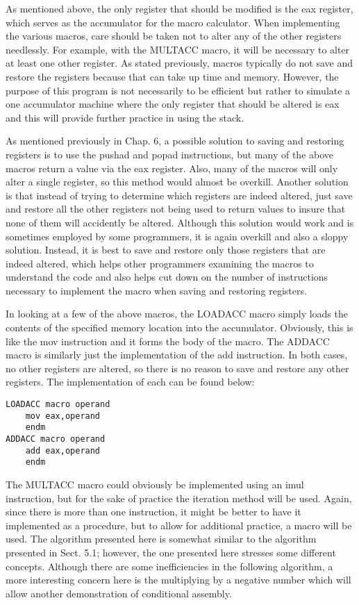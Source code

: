 \documentclass[10pt]{article}
\begin{document}
As mentioned above, the only register that should be modified is the eax register, which serves as the accumulator for the macro calculator. When implementing the various macros, care should be taken not to alter any of the other registers needlessly. For example, with the MULTACC macro, it will be necessary to alter at least one other register. As stated previously, macros typically do not save and restore the registers because that can take up time and memory. However, the purpose of this program is not necessarily to be efficient but rather to simulate a one accumulator machine where the only register that should be altered is eax and this will provide further practice in using the stack.

As mentioned previously in Chap. 6, a possible solution to saving and restoring registers is to use the pushad and popad instructions, but many of the above macros return a value via the eax register. Also, many of the macros will only alter a single register, so this method would almost be overkill. Another solution is that instead of trying to determine which registers are indeed altered, just save and restore all the other registers not being used to return values to insure that none of them will accidently be altered. Although this solution would work and is sometimes employed by some programmers, it is again overkill and also a sloppy solution. Instead, it is best to save and restore only those registers that are indeed altered, which helps other programmers examining the macros to understand the code and also helps cut down on the number of instructions necessary to implement the macro when saving and restoring registers.

In looking at a few of the above macros, the LOADACC macro simply loads the contents of the specified memory location into the accumulator. Obviously, this is like the mov instruction and it forms the body of the macro. The ADDACC macro is similarly just the implementation of the add instruction. In both cases, no other registers are altered, so there is no reason to save and restore any other registers. The implementation of each can be found below:

\begin{verbatim}
LOADACC macro operand
    mov eax,operand
    endm
ADDACC macro operand
    add eax,operand
    endm
\end{verbatim}

The MULTACC macro could obviously be implemented using an imul instruction, but for the sake of practice the iteration method will be used. Again, since there is more than one instruction, it might be better to have it implemented as a procedure, but to allow for additional practice, a macro will be used. The algorithm presented here is somewhat similar to the algorithm presented in Sect. 5.1; however, the one presented here stresses some different concepts. Although there are some inefficiencies in the following algorithm, a more interesting concern here is the multiplying by a negative number which will allow another demonstration of conditional assembly.
\end{document}
